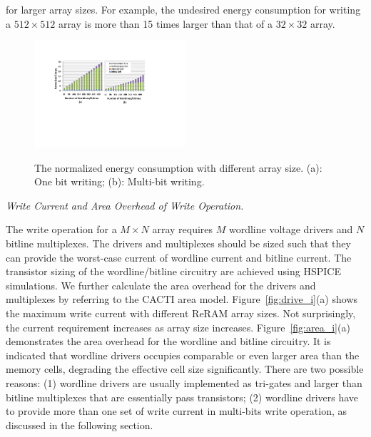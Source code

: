 for larger array sizes. For example, the undesired energy consumption for
writing a $512{\times}512$ array is more than 15 times larger than that of
a $32{\times}32$ array.
\begin{figure}%
\centering
  \includegraphics[width=0.5\textwidth]{./figures/energy_f_tall2.pdf}\\
  \caption{The normalized energy consumption with different array size. (a): One bit writing; (b): Multi-bit writing.}\label{fig:energy}
    \vspace{-10pt}
\end{figure}

\vspace{6pt} \emph{Write Current and Area Overhead of Write Operation.}
\vspace{6pt}

The write operation for a $M \times N$ array requires $M$ wordline voltage
drivers and $N$ bitline multiplexes. The drivers and multiplexes should be
sized such that they can provide the worst-case current of wordline
current and bitline current. The transistor sizing of the wordline/bitline
circuitry are achieved using HSPICE simulations. We further calculate the
area overhead for the drivers and multiplexes by referring to the CACTI
area model. Figure~\ref{fig:drive_i}(a) shows the maximum write current
with different ReRAM array sizes. Not surprisingly, the current
requirement increases as array size increases. Figure~\ref{fig:area_i}(a)
demonstrates the area overhead for the wordline and bitline circuitry. It
is indicated that wordline drivers occupies comparable or even larger area
than the memory cells, degrading the effective cell size significantly.
There are two possible reasons: (1) wordline drivers are usually
implemented as tri-gates and larger than bitline multiplexes that are
essentially pass transistors; (2) wordline drivers have to provide more
than one set of write current in multi-bits write operation, as discussed
in the following section.


